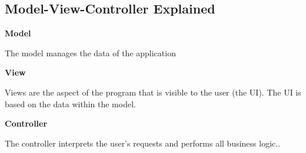 \subsection{Model-View-Controller Explained}

\noindent
\textbf{Model}

\noindent
The model manages the data of the application\cite{modelviewcontroller}

\vspace{5 mm}
\noindent
\textbf{View}

\noindent
Views are the aspect of the program that is visible to the user (the UI). The UI is based on the data within the 
model\cite{mvcasp}.

\vspace{5 mm}
\noindent
\textbf{Controller}

\noindent
The controller interprets the user's requests and performs all business logic.\cite{fowler06}.